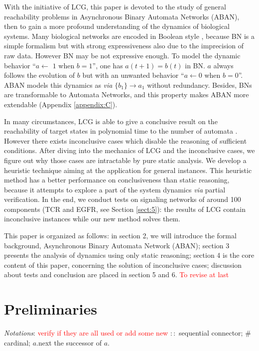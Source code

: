 \documentclass[runningheads]{llncs}
\newcommand{\ac}[3]{$\{#1\}\rightarrow#3$}
\begin{document}
With the initiative of LCG, this paper is devoted to the study of general reachability problems in Asynchronous Binary Automata Networks (ABAN), then to gain a more profound understanding of the dynamics of biological systems. 
Many biological networks are encoded in Boolean style \cite{kauffman1969}, because BN is a simple formalism but with strong expressiveness also due to the imprecision of raw data.
However BN may be not expressive enough.
To model the dynamic behavior ``$a\gets$ $1$ when $b=1$'', one has $a(t+1)=b(t)$ in BN.
$a$ always follows the evolution of $b$ but with an unwanted behavior ``$a\gets 0$ when $b=0$''.
ABAN models this dynamics as \textit{via} \ac{b_1}{a_0}{a_1} without redundancy. 
Besides, BNs are transformable to Automata Networks, and this property makes ABAN more extendable (Appendix \ref{appendix:C}).

In many circumstances, LCG is able to give a conclusive result on the reachability of target states in polynomial time to the number of automata \cite{pauleve2016goal}. 
However there exists inconclusive cases which disable the reasoning of sufficient conditions.
After diving into the mechanics of LCG and the inconclusive cases, we figure out why those cases are intractable by pure static analysis. 
We develop a heuristic technique aiming at the application for general instances. 
This heuristic method has a better performance on conclusiveness than static reasoning, because it attempts to explore a part of the system dynamics \textit{via} partial verification.
In the end, we conduct tests on signaling networks of around 100 components (TCR and EGFR, see Section \ref{sect:5}): the results of LCG contain inconclusive instances \cite{folschette2015} while our new method solves them.

This paper is organized as follows: in section 2, we will introduce the formal background, Asynchronous Binary Automata Network (ABAN); section 3 presents the analysis of dynamics using only static reasoning; 
section 4 is the core content of this paper, concerning the solution of inconclusive cases; discussion about tests and conclusion are placed in section 5 and 6. \textcolor{red}{To revise at last}

\section{Preliminaries}\label{sect:2}
\textit{Notations}:
\textcolor{red}{verify if they are all used or add some new}
$::$ sequential connector;
$\#$ cardinal;
$a.$next the successor of $a$. 
\end{document}
